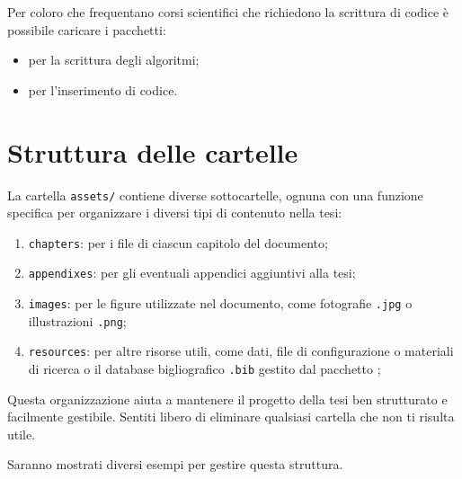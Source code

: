 Per coloro che frequentano corsi scientifici che richiedono la scrittura di codice è possibile caricare i pacchetti:
\begin{itemize}
    \item {} per la scrittura degli algoritmi;
    \item {} per l'inserimento di codice.
\end{itemize}

\section{Struttura delle cartelle}

La cartella \texttt{assets/} contiene diverse sottocartelle, ognuna con una funzione specifica per organizzare i diversi tipi di contenuto nella tesi:

\begin{enumerate}
    \item \texttt{chapters}: per i file di ciascun capitolo del documento;
    \item \texttt{appendixes}: per gli eventuali appendici aggiuntivi alla tesi;
    \item \texttt{images}: per le figure utilizzate nel documento, come fotografie \texttt{.jpg} o illustrazioni \texttt{.png};
    \item \texttt{resources}: per altre risorse utili, come dati, file di configurazione o materiali di ricerca o il database bigliografico \texttt{.bib} gestito dal pacchetto ;
\end{enumerate} 

Questa organizzazione aiuta a mantenere il progetto della tesi ben strutturato e facilmente gestibile.
Sentiti libero di eliminare qualsiasi cartella che non ti risulta utile.

Saranno mostrati diversi esempi per gestire questa struttura.